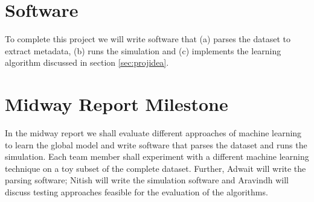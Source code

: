 \documentclass{article} %
\begin{document}
\section{Software}
To complete this project we will write software that (a) parses the dataset to extract metadata, (b) runs the simulation and (c) implements the learning algorithm discussed in section \ref{sec:projidea}.

\section{Midway Report Milestone}
In the midway report we shall evaluate different approaches of machine learning to learn the global model and write software that parses the dataset and runs the simulation. Each team member shall experiment with a different machine learning technique on a toy subset of the complete dataset. Further, Adwait will write the parsing software; Nitish will write the simulation software and Aravindh will discuss testing approaches feasible for the evaluation of the algorithms.
\end{document}

